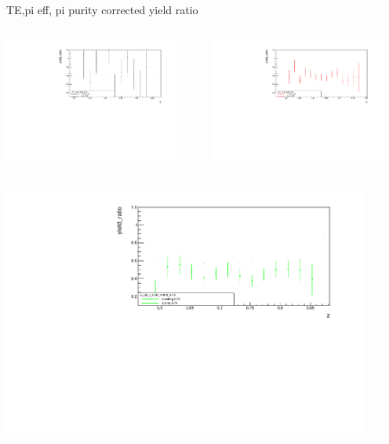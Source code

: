 \begin{frame}{TE,pi eff, pi purity corrected yield ratio}
\begin{columns}
\begin{column}[T]{0.5\textwidth}
\includegraphics[width = 0.9\textwidth]{results/yield/statistics_corr/x_Q2_z_40_4000_50_ratio.pdf}
\end{column}
\begin{column}[T]{0.5\textwidth}
\includegraphics[width = 0.9\textwidth]{results/yield/statistics_corr/x_Q2_z_40_4000_60_ratio.pdf}
\end{column}
\end{columns}
\begin{columns}
\begin{column}[T]{0.5\textwidth}
\includegraphics[width = 0.9\textwidth]{results/yield/statistics_corr/x_Q2_z_40_4000_70_ratio.pdf}

\end{column}
\end{columns}
\end{frame}
